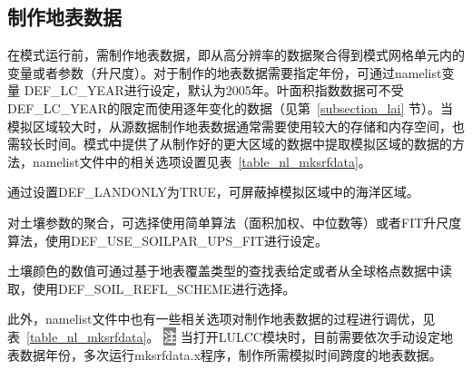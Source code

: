 \documentclass[a4paper,12pt,twoside]{article}
\begin{document}
\subsection{制作地表数据}

在模式运行前，需制作地表数据，即从高分辨率的数据聚合得到模式网格单元内的变量或者参数（升尺度）。对于制作的地表数据需要指定年份，可通过namelist变量 DEF\_LC\_YEAR进行设定，默认为2005年。叶面积指数数据可不受DEF\_LC\_YEAR的限定而使用逐年变化的数据（见第~\ref{subsection_lai} 节）。当模拟区域较大时，从源数据制作地表数据通常需要使用较大的存储和内存空间，也需较长时间。模式中提供了从制作好的更大区域的数据中提取模拟区域的数据的方法，namelist文件中的相关选项设置见表~\ref{table_nl_mksrfdata}。

通过设置DEF\_LANDONLY为TRUE，可屏蔽掉模拟区域中的海洋区域。

对土壤参数的聚合，可选择使用简单算法（面积加权、中位数等）或者FIT升尺度算法，使用DEF\_USE\_SOILPAR\_UPS\_FIT进行设定。

土壤颜色的数值可通过基于地表覆盖类型的查找表给定或者从全球格点数据中读取，使用DEF\_SOIL\_REFL\_SCHEME进行选择。

此外，namelist文件中也有一些相关选项对制作地表数据的过程进行调优，见表~\ref{table_nl_mksrfdata}。
\newline
\newline
\noindent \colorbox{gray}{\textcolor{white}{\bf{注}}} 当打开LULCC模块时，目前需要依次手动设定地表数据年份，多次运行mksrfdata.x程序，制作所需模拟时间跨度的地表数据。
\end{document}
